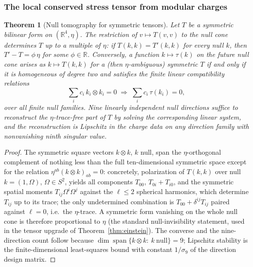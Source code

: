 \documentclass[11pt]{article}
\newtheorem{theorem}{Theorem}[section]
\begin{document}
\subsubsection{The local conserved stress tensor from modular charges}
\label{subsubsec:local-stress-from-modular-charges}

\begin{theorem}[Null tomography for symmetric tensors]
\label{thm:null-tomography}
Let \(T\) be a symmetric bilinear form on \((\mathbb R^4,\eta)\). The
restriction of \(v\mapsto T(v,v)\) to the null cone determines \(T\) up to a
multiple of \(\eta\): if \(T(k,k)=T'(k,k)\) for every null \(k\), then
\(T'-T=\phi\,\eta\) for some \(\phi\in\mathbb R\). Conversely, a function
\(k\mapsto\tau(k)\) on the future null cone arises as \(k\mapsto T(k,k)\) for
a (then \(\eta\)-ambiguous) symmetric \(T\) if and only if it is homogeneous
of degree two and satisfies the finite linear compatibility relations
\[
\sum_i c_i\,k_i\otimes k_i=0
\;\Longrightarrow\;
\sum_i c_i\,\tau(k_i)=0 ,
\]
over all finite null families. Nine linearly independent null directions
suffice to reconstruct the \(\eta\)-trace-free part of \(T\) by solving the
corresponding linear system, and the reconstruction is Lipschitz in the
charge data on any direction family with nonvanishing ninth singular value.
\end{theorem}

\begin{proof}
The symmetric square vectors \(k\otimes k\), \(k\) null, span the
\(\eta\)-orthogonal complement of nothing less than the full ten-dimensional
symmetric space except for the relation \(\eta^{ab}(k\otimes k)_{ab}=0\):
concretely, polarization of \(T(k,k)\) over null \(k=(1,\Omega)\),
\(\Omega\in S^2\), yields all components \(T_{00}\),
\(T_{0i}+T_{i0}\), and the symmetric spatial moments \(T_{ij}\Omega^i\Omega^j\)
against the \(\ell\leq2\) spherical harmonics, which determine \(T_{ij}\) up
to its trace; the only undetermined combination is
\(T_{00}+\delta^{ij}T_{ij}\) paired against \(\ell=0\), i.e.\ the
\(\eta\)-trace. A symmetric form vanishing on the whole null cone is
therefore proportional to \(\eta\) (the standard null-invisibility statement,
used in the tensor upgrade of Theorem~\ref{thm:einstein}). The
converse and the nine-direction count follow because
\(\dim\operatorname{span}\{k\otimes k:\ k\ \text{null}\}=9\); Lipschitz
stability is the finite-dimensional least-squares bound with constant
\(1/\sigma_9\) of the direction design matrix.
\end{proof}
\end{document}
